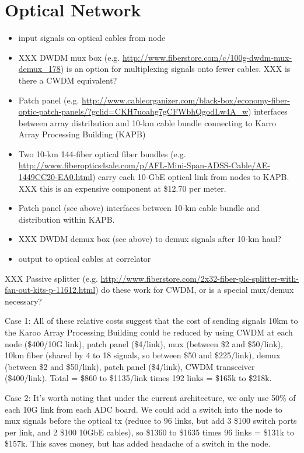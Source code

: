 \documentclass[11pt]{article}
\begin{document}
\section{Optical Network}
\begin{itemize}
\item input signals on optical cables from node
\item XXX DWDM mux box (e.g. \url{http://www.fiberstore.com/c/100g-dwdm-mux-demux_178}) is an option
for multiplexing signals onto fewer cables.  XXX is there a CWDM equivalent?
\item Patch panel (e.g. \url{http://www.cableorganizer.com/black-box/economy-fiber-optic-patch-panels/?gclid=CKH7uoahg7gCFWbhQgodLw4A_w}) interfaces between array distribution and 10-km cable bundle connecting to Karro Array
Processing Building (KAPB)
\item Two 10-km 144-fiber optical fiber bundles (e.g. \url{http://www.fiberoptics4sale.com/p/AFL-Mini-Span-ADSS-Cable/AE-1449CC20-EA0.html}) carry each 10-GbE optical link from nodes to KAPB. XXX this is an expensive component at \$12.70 per meter.
\item Patch panel (see above) interfaces between 10-km cable bundle and distribution within KAPB.
\item XXX DWDM demux box (see above) to demux signals after 10-km haul?  
\item output to optical cables at correlator
\end{itemize}

XXX Passive splitter (e.g. \url{http://www.fiberstore.com/2x32-fiber-plc-splitter-with-fan-out-kits-p-11612.html})
do these work for CWDM, or is a special mux/demux necessary?

Case 1: All of these relative costs suggest that the cost of sending signals 10km to
the Karoo Array Processing Building could be reduced by using CWDM at each node
(\$400/10G link), patch panel (\$4/link), mux (between \$2 and \$50/link), 10km
fiber (shared by 4 to 18 signals, so between \$50 and \$225/link), demux (between
\$2 and \$50/link), patch panel (\$4/link), CWDM transceiver (\$400/link).  Total =
\$860 to \$1135/link times 192 links = \$165k to \$218k.

Case 2: It's worth noting that under the current architecture, we only use 50\%
of each 10G link from each ADC board.  We could add a switch into the node to
mux signals before the optical tx (reduce to 96 links, but add 3 \$100 switch
ports per link, and 2 \$100 10GbE cables), so \$1360 to \$1635 times 96 links =
\$131k to \$157k.  This saves money, but has added headache of a switch in the
node. 
\end{document}
